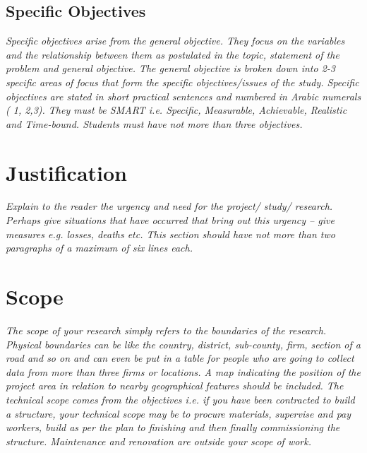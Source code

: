 \subsection{Specific Objectives}
\emph{Specific objectives arise from the general objective.
	They focus on the variables and the relationship between them as postulated in the topic, statement of the problem and general objective.
	The general objective is broken down into 2-3 specific areas of focus that form the specific objectives/issues of the study.
	Specific objectives are stated in short practical sentences and numbered in Arabic numerals ( 1, 2,3).
	They must be SMART i.e. Specific, Measurable, Achievable, Realistic and Time-bound.
	Students must have not more than three objectives.}

\section{Justification}
\emph{Explain to the reader the urgency and need for the project/ study/ research.
	Perhaps give situations that have occurred that bring out this urgency – give measures e.g. losses, deaths etc.
	This section should have not more than two paragraphs of a maximum of six lines each.}

\section{Scope}
\emph{The scope of your research simply refers to the boundaries of the research.
	Physical boundaries can be like the country, district, sub-county, firm, section of a road and so on and can even be put in a table for people who are going to collect data from more than three firms or locations.
	A map indicating the position of the project area in relation to nearby geographical features should be included.
	The technical scope comes from the objectives i.e. if you have been contracted to build a structure, your technical scope may be to procure materials, supervise and pay workers, build as per the plan to finishing and then finally commissioning the structure.
	Maintenance and renovation are outside your scope of work.}

